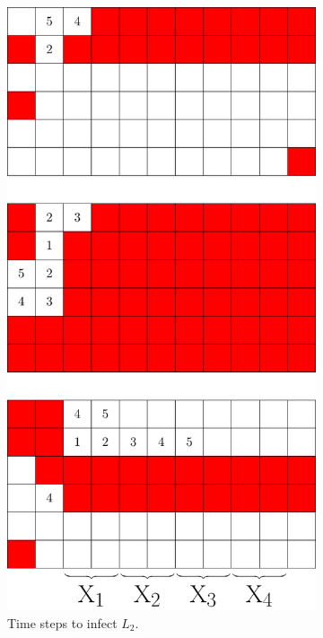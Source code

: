 \begin{figure}[]
\begin{subfigure}[t]{0.2915\textwidth}
\includegraphics[width=\textwidth]{figures/7/6x11x3_L2_numbered_heatmap.pdf}
\caption{Time steps to infect $L_2$.}
\label{fig:6x11x3_timesteps}
\end{subfigure}
\caption{}
\label{fig:}
\end{figure} 


